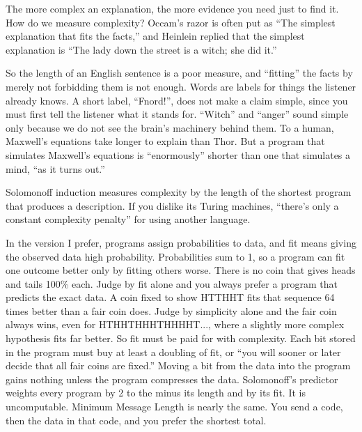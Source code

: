 
The more complex an explanation, the more evidence you need just to find it. How do we measure complexity? Occam's razor is often put as ``The simplest explanation that fits the facts,'' and Heinlein replied that the simplest explanation is ``The lady down the street is a witch; she did it.''

So the length of an English sentence is a poor measure, and ``fitting'' the facts by merely not forbidding them is not enough. Words are labels for things the listener already knows. A short label, ``Fnord!'', does not make a claim simple, since you must first tell the listener what it stands for. ``Witch'' and ``anger'' sound simple only because we do not see the brain's machinery behind them. To a human, Maxwell's equations take longer to explain than Thor. But a program that simulates Maxwell's equations is ``enormously'' shorter than one that simulates a mind, ``as it turns out.''

Solomonoff induction measures complexity by the length of the shortest program that produces a description. If you dislike its Turing machines, ``there's only a constant complexity penalty'' for using another language. 

In the version I prefer, programs assign probabilities to data, and fit means giving the observed data high probability. Probabilities sum to 1, so a program can fit one outcome better only by fitting others worse. There is no coin that gives heads and tails 100\% each. Judge by fit alone and you always prefer a program that predicts the exact data. A coin fixed to show HTTHHT fits that sequence 64 times better than a fair coin does. Judge by simplicity alone and the fair coin always wins, even for HTHHTHHHTHHHHT..., where a slightly more complex hypothesis fits far better. So fit must be paid for with complexity. Each bit stored in the program must buy at least a doubling of fit, or ``you will sooner or later decide that all fair coins are fixed.'' Moving a bit from the data into the program gains nothing unless the program compresses the data. Solomonoff's predictor weights every program by 2 to the minus its length and by its fit. It is uncomputable.  Minimum Message Length is nearly the same. You send a code, then the data in that code, and you prefer the shortest total.

